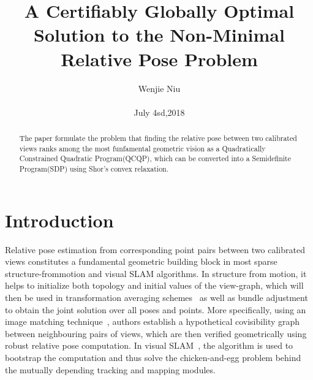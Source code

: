 \documentclass[10pt,twocolumn,letterpaper]{article}
\begin{document}
\title{A Certifiably Globally Optimal Solution
to the Non-Minimal Relative Pose Problem}

\author{Wenjie Niu\\\\ July 4sd,2018}

\maketitle

\begin{abstract}
The paper formulate the problem that finding the relative pose between two calibrated views ranks among the most funfamental geometric vision as a Quadratically Constrained Quadratic Program(QCQP), which can be converted into a  Semidefinite Program(SDP) using Shor's convex relaxation.\par
\end{abstract}

\section{Introduction}
Relative pose estimation from corresponding point pairs between two calibrated views constitutes a fundamental geometric building block in most sparse structure-frommotion and visual SLAM algorithms. In structure from motion, it helps to initialize both topology and initial values of the view-graph, which will then be used in transformation averaging schemes~\cite{Hartley2013Rotation} as well as bundle adjustment to obtain the joint solution over all poses and points. More specifically, using an image matching technique~\cite{Nister2006Scalable}, authors establish a hypothetical covisibility graph between neighbouring pairs of views, which are then verified geometrically using robust relative pose computation. In visual SLAM~\cite{Mur2015ORB}, the algorithm is used to bootstrap the computation and thus solve the chicken-and-egg problem behind the mutually depending tracking and mapping modules.
\end{document}
